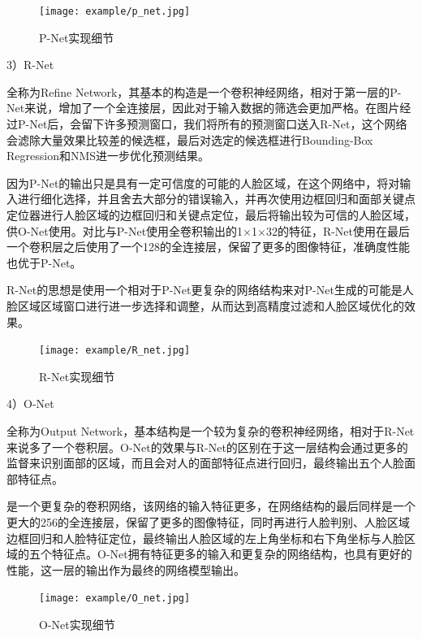 \begin{figure}[!htp]

\centering
\texttt{[image: example/p\_net.jpg]}
\caption{P-Net实现细节}
\label{figure:3-2}

\end{figure}

3）R-Net

全称为Refine Network，其基本的构造是一个卷积神经网络，相对于第一层的P-Net来说，增加了一个全连接层，因此对于输入数据的筛选会更加严格。在图片经过P-Net后，会留下许多预测窗口，我们将所有的预测窗口送入R-Net，这个网络会滤除大量效果比较差的候选框，最后对选定的候选框进行Bounding-Box Regression和NMS进一步优化预测结果。

因为P-Net的输出只是具有一定可信度的可能的人脸区域，在这个网络中，将对输入进行细化选择，并且舍去大部分的错误输入，并再次使用边框回归和面部关键点定位器进行人脸区域的边框回归和关键点定位，最后将输出较为可信的人脸区域，供O-Net使用。对比与P-Net使用全卷积输出的1$\times$1$\times$32的特征，R-Net使用在最后一个卷积层之后使用了一个128的全连接层，保留了更多的图像特征，准确度性能也优于P-Net。

R-Net的思想是使用一个相对于P-Net更复杂的网络结构来对P-Net生成的可能是人脸区域区域窗口进行进一步选择和调整，从而达到高精度过滤和人脸区域优化的效果。
\begin{figure}[!htp]

\centering
\texttt{[image: example/R\_net.jpg]}
\caption{R-Net实现细节}
\label{figure:3-2}

\end{figure}

4）O-Net

全称为Output Network，基本结构是一个较为复杂的卷积神经网络，相对于R-Net来说多了一个卷积层。O-Net的效果与R-Net的区别在于这一层结构会通过更多的监督来识别面部的区域，而且会对人的面部特征点进行回归，最终输出五个人脸面部特征点。

是一个更复杂的卷积网络，该网络的输入特征更多，在网络结构的最后同样是一个更大的256的全连接层，保留了更多的图像特征，同时再进行人脸判别、人脸区域边框回归和人脸特征定位，最终输出人脸区域的左上角坐标和右下角坐标与人脸区域的五个特征点。O-Net拥有特征更多的输入和更复杂的网络结构，也具有更好的性能，这一层的输出作为最终的网络模型输出。

\begin{figure}[!htp]

\centering
\texttt{[image: example/O\_net.jpg]}
\caption{O-Net实现细节}
\label{figure:3-2}

\end{figure}

